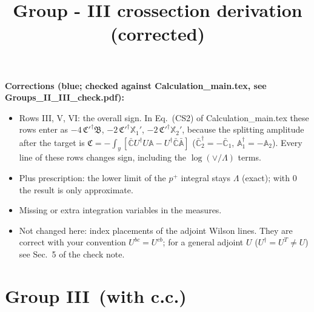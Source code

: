 \documentclass[9pt]{article}
\title{Group - III crossection derivation {\color{blue}(corrected)}}
\author{}
\date{}
\numberwithin{equation}{section}
\begin{document}
\maketitle
{\color{blue}\noindent\textbf{Corrections (blue; checked against Calculation\_main.tex, see Groups\_II\_III\_check.pdf):}
\begin{itemize}
\item Rows III, V, VI: the overall sign. In Eq.~(CS2) of Calculation\_main.tex these rows enter as $-4\,\mathfrak C'^\dagger\mathfrak B$, $-2\,\mathfrak C'^\dagger\mathbb X_1'$, $-2\,\mathfrak C'^\dagger\mathbb X_2'$, because the splitting amplitude after the target is $\mathfrak C=-\int_y[\bar{\mathbb C}U^\dagger U\mathbb A-U^\dagger\bar{\mathbb C}\bar{\mathbb A}]$ ($\bar{\mathbb C}^\dagger_2=-\bar{\mathbb C}_1$, $\mathbb A^{\dagger}_1=-\mathbb A_2$). Every line of these rows changes sign, including the $\log(\vee/\Lambda)$ terms.
\item Plus prescription: the lower limit of the $p^+$ integral stays $\Lambda$ (exact); with $0$ the result is only approximate.
\item Missing or extra integration variables in the measures.
\item Not changed here: index placements of the adjoint Wilson lines. They are correct with your convention $U^{bc}=U^{cb}$; for a general adjoint $U$ ($U^\dagger=U^T\neq U$) see Sec.~5 of the check note.
\end{itemize}}
\section{Group III\, (with c.c.)}
\end{document}
